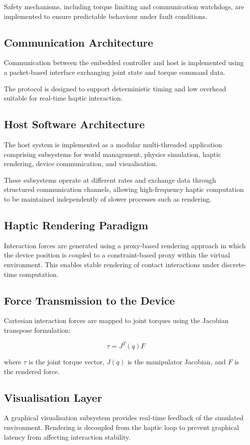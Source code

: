 Safety mechanisms, including torque limiting and communication watchdogs, are implemented to ensure predictable behaviour under fault conditions.

\subsection{Communication Architecture}

Communication between the embedded controller and host is implemented using a packet-based interface exchanging joint state and torque command data.

The protocol is designed to support deterministic timing and low overhead suitable for real-time haptic interaction.

\subsection{Host Software Architecture}

The host system is implemented as a modular multi-threaded application comprising subsystems for world management, physics simulation, haptic rendering, device communication, and visualisation.

These subsystems operate at different rates and exchange data through structured communication channels, allowing high-frequency haptic computation to be maintained independently of slower processes such as rendering.

\subsection{Haptic Rendering Paradigm}

Interaction forces are generated using a proxy-based rendering approach in which the device position is coupled to a constraint-based proxy within the virtual environment. This enables stable rendering of contact interactions under discrete-time computation.

\subsection{Force Transmission to the Device}

Cartesian interaction forces are mapped to joint torques using the Jacobian transpose formulation:

\begin{equation}
	\tau = J^{T}(q)F
\end{equation}

where $\tau$ is the joint torque vector, $J(q)$ is the manipulator Jacobian, and $F$ is the rendered force.

\subsection{Visualisation Layer}

A graphical visualisation subsystem provides real-time feedback of the simulated environment. Rendering is decoupled from the haptic loop to prevent graphical latency from affecting interaction stability.